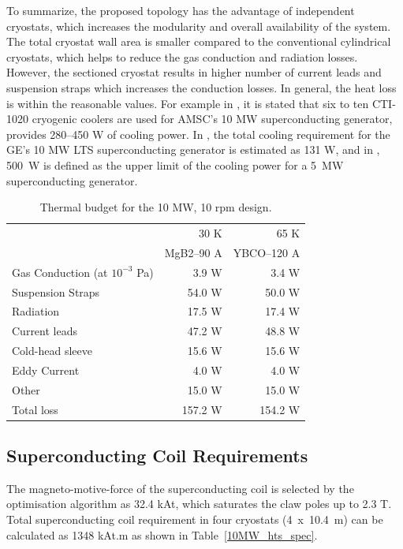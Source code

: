 \documentclass[12pt]{iopart}
\begin{document}
To summarize, the proposed topology has the advantage of independent cryostats, which increases the modularity and overall availability of the system. The total cryostat wall area is smaller compared to the conventional cylindrical cryostats, which helps to reduce the gas conduction and radiation losses. However, the sectioned cryostat results in higher number of current leads and suspension straps which increases the conduction losses. In general, the heat loss is within the reasonable values. For example in \cite{Snitchler2011}, it is stated that six to ten CTI-1020 cryogenic coolers are used for AMSC's 10 MW superconducting generator, provides 280--450 W of cooling power.
In \cite{Stautner2012}, the total cooling requirement for the GE's 10 MW LTS superconducting generator is estimated as 131 W, and in \cite{Abrahamsen2012}, 500~W is defined as the upper limit of the cooling power for a 5~MW superconducting generator.

\begin{table}
  \centering
  \begin{tabular}{lrr}
& 30 K & 65 K \\
& MgB2--90 A & YBCO--120 A \\
\hline
Gas Conduction (at $10^{-3}$ Pa) & 3.9 W & 3.4 W\\
Suspension Straps & 54.0 W & 50.0 W\\
Radiation & 17.5 W & 17.4 W\\
Current leads & 47.2 W & 48.8 W \\
Cold-head sleeve & 15.6 W & 15.6 W\\
Eddy Current & 4.0 W & 4.0 W\\
Other & 15.0 W & 15.0 W\\
\hline
Total loss & 157.2 W & 154.2 W\\
\hline
 \end{tabular}
  \caption{Thermal budget for the 10 MW, 10 rpm design. }
  \label{10MW_thermal_budget}
\end{table}

\subsection{Superconducting Coil Requirements}

The magneto-motive-force of the superconducting coil is selected by the optimisation algorithm as 32.4 kAt, which saturates the claw poles up to 2.3 T. Total superconducting coil requirement in four cryostats (4~x~10.4~m) can be calculated as 1348 kAt.m as shown in Table~\ref{10MW_hts_spec}.
\end{document}
